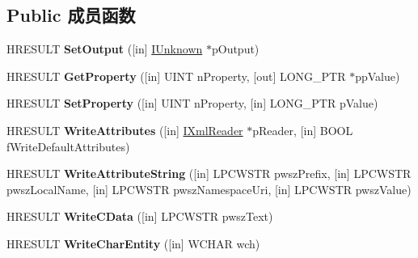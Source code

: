 \subsection*{Public 成员函数}
\begin{DoxyCompactItemize}
\item 
\mbox{\label{interface_i_xml_writer_ac15c76211e2e90d1503b422d47a2b759}} 
H\+R\+E\+S\+U\+LT {\bfseries Set\+Output} (\mbox{[}in\mbox{]} \hyperlink{interface_i_unknown}{I\+Unknown} $\ast$p\+Output)
\item 
\mbox{\label{interface_i_xml_writer_aa469ff587306a4e824b3f149ce886a7e}} 
H\+R\+E\+S\+U\+LT {\bfseries Get\+Property} (\mbox{[}in\mbox{]} U\+I\+NT n\+Property, \mbox{[}out\mbox{]} L\+O\+N\+G\+\_\+\+P\+TR $\ast$pp\+Value)
\item 
\mbox{\label{interface_i_xml_writer_a8e335394d0d845c4a5a2993b050f44d3}} 
H\+R\+E\+S\+U\+LT {\bfseries Set\+Property} (\mbox{[}in\mbox{]} U\+I\+NT n\+Property, \mbox{[}in\mbox{]} L\+O\+N\+G\+\_\+\+P\+TR p\+Value)
\item 
\mbox{\label{interface_i_xml_writer_a0e48e560bd1594e2ddca11d943dd8198}} 
H\+R\+E\+S\+U\+LT {\bfseries Write\+Attributes} (\mbox{[}in\mbox{]} \hyperlink{interface_i_xml_reader}{I\+Xml\+Reader} $\ast$p\+Reader, \mbox{[}in\mbox{]} B\+O\+OL f\+Write\+Default\+Attributes)
\item 
\mbox{\label{interface_i_xml_writer_aad5be939c7810856e6b9816fe5617891}} 
H\+R\+E\+S\+U\+LT {\bfseries Write\+Attribute\+String} (\mbox{[}in\mbox{]} L\+P\+C\+W\+S\+TR pwsz\+Prefix, \mbox{[}in\mbox{]} L\+P\+C\+W\+S\+TR pwsz\+Local\+Name, \mbox{[}in\mbox{]} L\+P\+C\+W\+S\+TR pwsz\+Namespace\+Uri, \mbox{[}in\mbox{]} L\+P\+C\+W\+S\+TR pwsz\+Value)
\item 
\mbox{\label{interface_i_xml_writer_a812d73486787e79d0db2a36c46f39c32}} 
H\+R\+E\+S\+U\+LT {\bfseries Write\+C\+Data} (\mbox{[}in\mbox{]} L\+P\+C\+W\+S\+TR pwsz\+Text)
\item 
\mbox{\label{interface_i_xml_writer_a084f129d080d7dcc76141f5b2cfe4fbf}} 
H\+R\+E\+S\+U\+LT {\bfseries Write\+Char\+Entity} (\mbox{[}in\mbox{]} W\+C\+H\+AR wch)

\end{DoxyCompactItemize}
